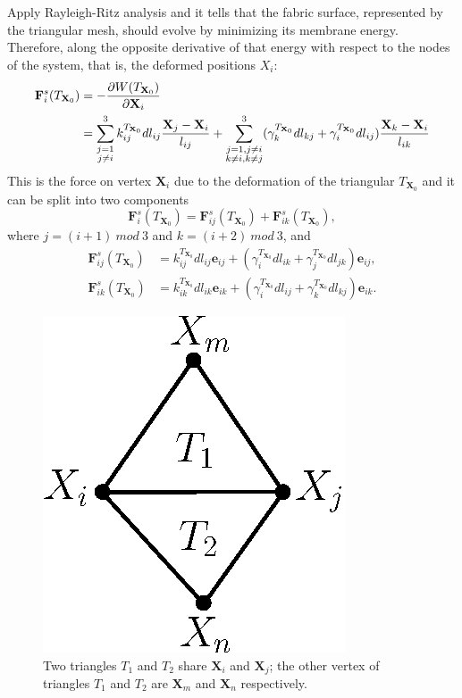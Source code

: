 Apply Rayleigh-Ritz analysis and it tells that the fabric surface, represented
by the triangular mesh, should evolve by minimizing its membrane energy.
Therefore, along the opposite derivative of that energy with respect to the
nodes of the system, that is, the deformed positions $X_i$:
\begin{align}
\mathbf{F}_{i}^{s}(T_{\mathbf{X}_{0}}) &=  -\frac{\partial W(T_{\mathbf{X}_{0}})}{\partial \mathbf{X}_{i}} \notag \\
&= \sum_{\substack{j=1\\j\neq i}}^{3} k_{ij}^{T_{\mathbf{X}_{0}}} dl_{ij} \frac{\mathbf{X}_{j}-\mathbf{X}_{i}}{l_{ij}} + 
\sum_{\substack{j=1,j\neq i\\k\neq i,k\neq j}}^{3} (\gamma_{k}^{T_{\mathbf{X}_{0}}} dl_{kj} + \gamma_{i}^{T_{\mathbf{X}_{0}}}dl_{ij}) \frac{\mathbf{X}_{k}-\mathbf{X}_{i}}{l_{ik}}
\label{eqn:tri_sm_force}
\end{align}
This is the force on vertex $\mathbf{X}_{i}$ due to the deformation of the
triangular $T_{\mathbf{X}_{0}}$ and it can be split into two components
\begin{equation}
\mathbf{F}_{i}^{s}(T_{\mathbf{X}_{0}}) = \mathbf{F}_{ij}^{s}(T_{\mathbf{X}_{0}}) + \mathbf{F}_{ik}^{s}(T_{\mathbf{X}_{0}}),
\end{equation}
where $j=(i+1)\ mod\ 3$ and $k=(i+2)\ mod\ 3$, and
\begin{align}
\mathbf{F}_{ij}^{s}(T_{\mathbf{X}_{0}}) &= k_{ij}^{T_{\mathbf{X}_{0}}} dl_{ij} \mathbf{e}_{ij} + (\gamma_i^{T_{\mathbf{X}_{0}}} dl_{ik} + \gamma_{j}^{T_{\mathbf{X}_{0}}} dl_{jk}) \mathbf{e}_{ij}, \\
\mathbf{F}_{ik}^{s}(T_{\mathbf{X}_{0}}) &= k_{ik}^{T_{\mathbf{X}_{0}}} dl_{ik} \mathbf{e}_{ik} + (\gamma_i^{T_{\mathbf{X}_{0}}} dl_{ij} + \gamma_{k}^{T_{\mathbf{X}_{0}}} dl_{kj}) \mathbf{e}_{ik}.
\end{align}
\begin{figure}[!ht]
    \centering
    \includegraphics[width=0.4\columnwidth]{figures/force_ij}
    \caption{Two triangles $T_1$ and $T_2$ share $\mathbf{X}_i$ and
    $\mathbf{X}_j$; the other vertex of triangles $T_1$ and $T_2$ are
    $\mathbf{X}_m$ and $\mathbf{X}_n$ respectively.}
    \label{fig:force_ij}
\end{figure}

